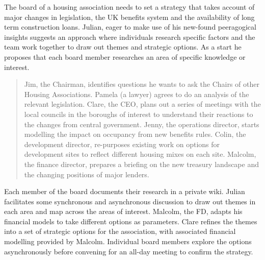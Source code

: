 The board of a housing association needs to set a strategy that takes
account of major changes in legislation, the UK benefits system and the
availability of long term construction loans. Julian, eager to make use
of his new-found peeragogical insights suggests an approach where
individuals research specific factors and the team work together to draw
out themes and strategic options. As a start he proposes that each board
member researches an area of specific knowledge or interest.

\begin{quote}
Jim, the Chairman, identifies questions he wants to ask the Chairs of
other Housing Associations. Pamela (a lawyer) agrees to do an analysis
of the relevant legislation. Clare, the CEO, plans out a series of
meetings with the local councils in the boroughs of interest to
understand their reactions to the changes from central government.
Jenny, the operations director, starts modelling the impact on occupancy
from new benefits rules. Colin, the development director, re-purposes
existing work on options for development sites to reflect different
housing mixes on each site. Malcolm, the finance director, prepares a
briefing on the new treasury landscape and the changing positions of
major lenders.
\end{quote}
Each member of the board documents their research in a private wiki.
Julian facilitates some synchronous and asynchronous discussion to draw
out themes in each area and map across the areas of interest. Malcolm,
the FD, adapts his financial models to take different options as
parameters. Clare refines the themes into a set of strategic options for
the association, with associated financial modelling provided by
Malcolm. Individual board members explore the options asynchronously
before convening for an all-day meeting to confirm the strategy.
